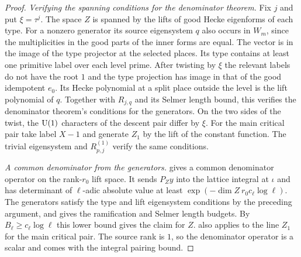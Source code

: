 \begin{proof}
\emph{Verifying the spanning conditions for the denominator theorem.}
Fix $j$ and put $\xi=\tau^j$. The space $Z$ is spanned by the lifts of good Hecke eigenforms of each type.
For a nonzero generator its source eigensystem $q$ also occurs in $W_m$, since the multiplicities in the good parts of the inner forms are equal.
The vector is in the image of the type projector at the selected places. Its type contains at least one primitive label over each level prime. After twisting by $\xi$ the relevant labels do not have the root $1$ and the type projection has image in that of the good idempotent $e_0$.
Its Hecke polynomial at a split place outside the level is the lift polynomial of $q$.
Together with $R_{j,q}$ and its Selmer length bound, this verifies the denominator theorem's conditions for the generators. On the two sides of the twist, the $\operatorname{U}(1)$ characters of the descent pair differ by $\xi$.
For the main critical pair take label $X-1$ and generate $Z_1$ by the lift of the constant function. The trivial eigensystem and $R_{p,j}^{(1)}$ verify the same conditions.

\emph{A common denominator from the generators.}
 gives a common denominator operator on the rank-$r_0$ lift space. It sends $P_Zy$ into the lattice integral at $\iota$ and has determinant of $\ell$-adic absolute value at least $\exp(-\dim Z\ r_0 c_\ell\log\ell)$.
The generators satisfy the type and lift eigensystem conditions by the preceding argument, and  gives the ramification and Selmer length budgets.
By $B_\ell\ge c_\ell\log\ell$ this lower bound gives the claim for $Z$.
 also applies to the line $Z_1$ for the main critical pair. The source rank is $1$, so the denominator operator is a scalar and comes with the integral pairing bound.


\end{proof}
